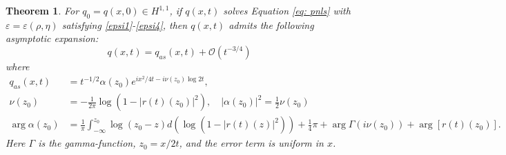 \documentclass{amsart}
\theoremstyle{plain}
\newtheorem{theorem}{Theorem}[section]
\theoremstyle{remark}
\numberwithin{equation}{section}
\begin{document}
\begin{theorem}
\label{main}
  For $q_0=q(x,0)\in H^{1,1}$, if  $q(x,t)$ solves Equation \eqref{eq: pnls} with $\varepsilon=\varepsilon(\rho, \eta)$ satisfying \eqref{epsi1}-\eqref{epsi4}, then $q(x,t)$ admits the following asymptotic expansion:
  \begin{equation}
      q(x,t)=q_{as}(x,t)+\mathcal{O}(t^{-3/4})
  \end{equation}
  where
  \begin{align*}
      q_{as}(x,t)&=t^{-1 / 2} \alpha\left(z_0\right) e^{i x^2 / 4 t-i \nu\left(z_0\right) \log 2 t},\\
      \nu\left(z_0\right) &=-\frac{1}{2 \pi} \log \left(1-\left|r(t)\left(z_0\right)\right|^2\right), \quad \left|\alpha\left(z_0\right)\right|^2=\frac{1}{2} \nu\left(z_0\right)\\
      \arg \alpha\left(z_0\right)&=\frac{1}{\pi} \int_{-\infty}^{z_0} \log \left(z_0-z\right) d\left(\log \left(1-\left|r(t)(z)\right|^2\right)\right)+\frac{1}{4} \pi+\arg \Gamma\left(i \nu\left(z_0\right)\right)+\arg \left[r(t)\left( z_0\right) \right].
      \end{align*}
      Here $\Gamma $ is the gamma-function, $z_0=x / 2 t$,  and the error term is uniform in $x$.
\end{theorem}
\end{document}
